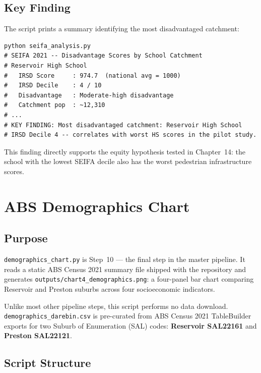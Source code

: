 \documentclass[11pt,a4paper,openany]{book}
\begin{document}
\section{Key Finding}

The script prints a summary identifying the most disadvantaged catchment:

\begin{lstlisting}[style=bash, caption={SEIFA analysis console summary.}]
python seifa_analysis.py
# SEIFA 2021 -- Disadvantage Scores by School Catchment
# Reservoir High School
#   IRSD Score     : 974.7  (national avg = 1000)
#   IRSD Decile    : 4 / 10
#   Disadvantage   : Moderate-high disadvantage
#   Catchment pop  : ~12,310
# ...
# KEY FINDING: Most disadvantaged catchment: Reservoir High School
# IRSD Decile 4 -- correlates with worst HS scores in the pilot study.
\end{lstlisting}

This finding directly supports the equity hypothesis tested in Chapter~14: the school with
the lowest SEIFA decile also has the worst pedestrian infrastructure scores.

\chapter{ABS Demographics Chart}

\section{Purpose}

\texttt{demographics\_chart.py} is Step~10 --- the final step in the master pipeline.
It reads a static ABS Census 2021 summary file shipped with the repository and generates
\texttt{outputs/chart4\_demographics.png}: a four-panel bar chart comparing Reservoir
and Preston suburbs across four socioeconomic indicators.

Unlike most other pipeline steps, this script performs no data download.
\texttt{demographics\_darebin.csv} is pre-curated from ABS Census 2021 TableBuilder
exports for two Suburb of Enumeration (SAL) codes:
\textbf{Reservoir SAL22161} and \textbf{Preston SAL22121}.

\section{Script Structure}
\end{document}
